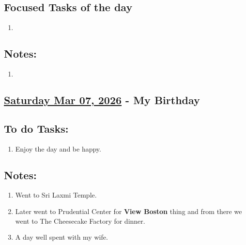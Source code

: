 \subsection*{Focused Tasks of the day}
\begin{enumerate}[\ding{212}]  
    \item 
\end{enumerate}
\subsection*{Notes:}
\begin{enumerate}
    \item 
\end{enumerate}
\subsection*{\underline{Saturday Mar 07, 2026} - My Birthday }
\subsection*{To do Tasks:}
\begin{enumerate}
    \item Enjoy the day and be happy.
\end{enumerate}
\subsection*{Notes:}
\begin{enumerate}
    \item Went to Sri Laxmi Temple.
    \item Later went to Prudential Center for \textbf{View Boston} thing and from there we went to The Cheesecake Factory for dinner.
    \item A day well spent with my wife.
\end{enumerate}
\stardivider
